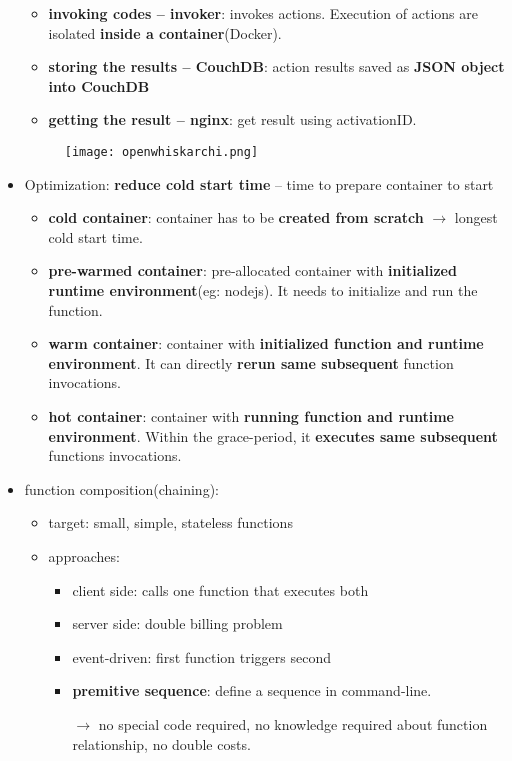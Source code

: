\begin{itemize}
\begin{itemize}
		\item \textbf{invoking codes -- invoker}: invokes actions. Execution of actions are isolated \textbf{inside a container}(Docker).  
		\item \textbf{storing the results -- CouchDB}: action results saved as \textbf{JSON object into CouchDB}
		\item \textbf{getting the result -- nginx}: get result using activationID. 
	\end{itemize}
	\begin{figure}[H]
		\centering
		\texttt{[image: openwhiskarchi.png]}
	\end{figure}




	\item Optimization: \textbf{reduce cold start time} -- time to prepare container to start
	\begin{itemize}
		\item \textbf{cold container}: container has to be \textbf{created from scratch} $\rightarrow$ longest cold start time.
		\item \textbf{pre-warmed container}: pre-allocated container with \textbf{initialized runtime environment}(eg: nodejs). It needs to initialize and run the function.   
		\item \textbf{warm container}: container with \textbf{initialized function and runtime environment}. It can directly \textbf{rerun same subsequent} function invocations. 
		\item \textbf{hot container}: container with \textbf{running function and runtime environment}. Within the grace-period, it \textbf{executes same subsequent} functions invocations. 
	\end{itemize}
	
	
	\item function composition(chaining): 
	\begin{itemize}
		\item target: small, simple, stateless functions
		\item approaches:
		\begin{itemize}
			\item client side: calls one function that executes both
			\item server side: double billing problem
			\item event-driven: first function triggers second
			\item \textbf{premitive sequence}: define a sequence in command-line.
			
			$\rightarrow$ no special code required, no knowledge required about function relationship, no double costs.
		\end{itemize}
	\end{itemize}
	
\end{itemize}


